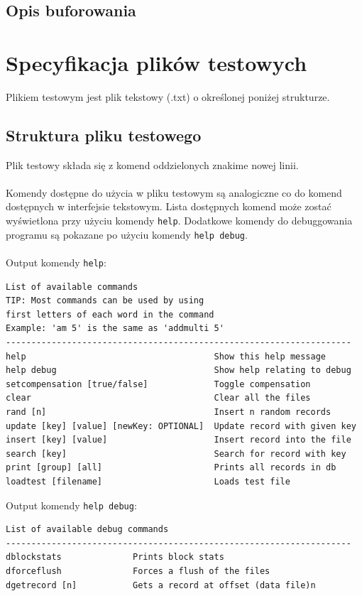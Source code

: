 \documentclass[12pt]{article}
\begin{document}
\subsection{Opis buforowania}
 
\section{Specyfikacja plików testowych}
Plikiem testowym jest plik tekstowy (.txt) o określonej poniżej strukturze.
\subsection{Struktura pliku testowego}
Plik testowy składa się z komend oddzielonych znakime nowej linii.
\\\\
Komendy dostępne do użycia w pliku testowym są analogiczne co do komend dostępnych w interfejsie tekstowym.
Lista dostępnych komend może zostać wyświetlona przy użyciu komendy \verb!help!. Dodatkowe komendy do debuggowania
programu są pokazane po użyciu komendy \verb!help debug!.
\\\\
Output komendy \verb!help!:

\begin{tcolorbox}[colframe=black!75, colback=white!95, title=Output komendy \texttt{help}]
\begin{verbatim}
List of available commands
TIP: Most commands can be used by using 
first letters of each word in the command
Example: 'am 5' is the same as 'addmulti 5'
--------------------------------------------------------------------
help                                     Show this help message
help debug                               Show help relating to debug
setcompensation [true/false]             Toggle compensation
clear                                    Clear all the files
rand [n]                                 Insert n random records
update [key] [value] [newKey: OPTIONAL]  Update record with given key
insert [key] [value]                     Insert record into the file
search [key]                             Search for record with key
print [group] [all]                      Prints all records in db
loadtest [filename]                      Loads test file
\end{verbatim}
\end{tcolorbox}

Output komendy \verb!help debug!:

\begin{tcolorbox}[colframe=black!75, colback=white!95, title=Output komendy \texttt{help debug}]
\begin{verbatim}
List of available debug commands
--------------------------------------------------------------------
dblockstats              Prints block stats
dforceflush              Forces a flush of the files
dgetrecord [n]           Gets a record at offset (data file)n
\end{verbatim}
\end{tcolorbox}
\end{document}

